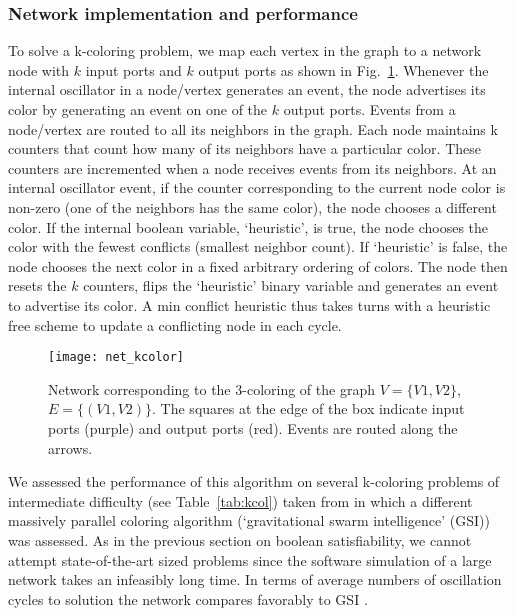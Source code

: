 \documentclass[10pt]{article}
\begin{document}
\subsubsection*{Network implementation and performance}
\label{sec:kalg}
To solve a k-coloring problem, we map each vertex in the graph to a network node with $k$ input ports and $k$ output ports as shown in Fig.~\ref{fig:net_kcolor}. Whenever the internal oscillator in a node/vertex generates an event, the node advertises its color by generating an event on one of the $k$ output ports. Events from a node/vertex are routed to all its neighbors in the graph. Each node maintains k counters that count how many of its neighbors have a particular color. These counters are incremented when a node receives events from its neighbors. At an internal oscillator event, if the counter corresponding to the current node color is non-zero (one of the neighbors has the same color), the node chooses a different color. If the internal boolean variable, `heuristic', is true, the node chooses the color with the fewest conflicts (smallest neighbor count). If `heuristic' is false, the node chooses the next color in a fixed arbitrary ordering of colors. The node then resets the $k$ counters, flips the `heuristic' binary variable and generates an event to advertise its color. A min conflict heuristic thus takes turns with a heuristic free scheme to update a conflicting node in each cycle.




\begin{figure}
  \centering
     \texttt{[image: net\_kcolor]} 
     \caption{Network corresponding to the 3-coloring of the graph $V=\lbrace V1,V2\rbrace$, $E=\lbrace (V1,V2)\rbrace$. The squares at the edge of the box indicate input ports (purple) and output ports (red). Events are routed along the arrows.}
\label{fig:net_kcolor}
\end{figure}	


We assessed the performance of this algorithm on several k-coloring problems of intermediate difficulty (see Table~\ref{tab:kcol}) taken from \cite{Ruiz_Romay11} in which a different massively parallel coloring algorithm (`gravitational swarm intelligence' (GSI)) was assessed. As in the previous section on boolean satisfiability, we cannot attempt state-of-the-art sized problems since the software simulation of a large network takes an infeasibly long time. In terms of average numbers of oscillation cycles to solution the network compares favorably to GSI \cite{Ruiz_Romay11}.
\end{document}
